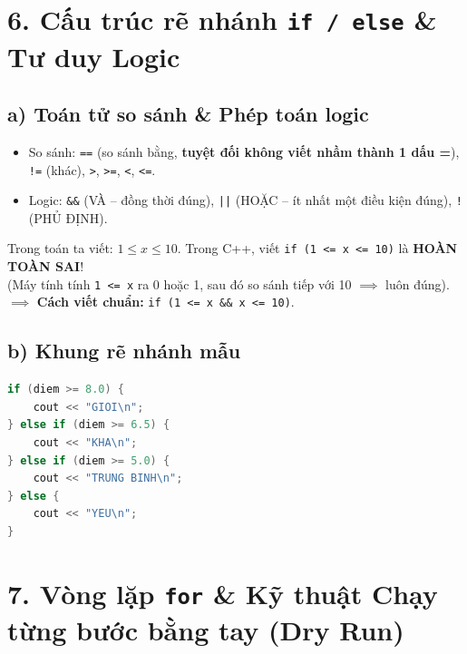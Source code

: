 \documentclass[11pt,a4paper]{article}
\begin{document}
\section*{\color{AsianDarkBlue}\normalsize 6. Cấu trúc rẽ nhánh \texttt{if / else} \& Tư duy Logic}

\subsection*{\color{AsianBlue}\small a) Toán tử so sánh \& Phép toán logic}
\begin{itemize}
    \setlength{\itemsep}{1.5pt}
    \small
    \item So sánh: \texttt{==} (so sánh bằng, \textbf{tuyệt đối không viết nhầm thành 1 dấu =}), \texttt{!=} (khác), \texttt{>}, \texttt{>=}, \texttt{<}, \texttt{<=}.
    \item Logic: \texttt{\&\&} (VÀ -- đồng thời đúng), \texttt{||} (HOẶC -- ít nhất một điều kiện đúng), \texttt{!} (PHỦ ĐỊNH).
\end{itemize}

\begin{tcolorbox}[colback=red!5!white,colframe=red!75!black,arc=1mm,title=\textbf{\footnotesize BẪY TOÁN HỌC TRONG C++: ĐIỀU KIỆN KẸP GIỮA}]
\footnotesize
Trong toán ta viết: $1 \le x \le 10$. Trong C++, viết \texttt{if (1 <= x <= 10)} là \textbf{HOÀN TOÀN SAI}!\\
(Máy tính tính \texttt{1 <= x} ra 0 hoặc 1, sau đó so sánh tiếp với 10 $\implies$ luôn đúng).\\
$\implies$ \textbf{Cách viết chuẩn:} \texttt{if (1 <= x \&\& x <= 10)}.
\end{tcolorbox}

\subsection*{\color{AsianBlue}\small b) Khung rẽ nhánh mẫu}
\begin{lstlisting}[language=C++]
if (diem >= 8.0) {
    cout << "GIOI\n";
} else if (diem >= 6.5) {
    cout << "KHA\n";
} else if (diem >= 5.0) {
    cout << "TRUNG BINH\n";
} else {
    cout << "YEU\n";
}
\end{lstlisting}

\section*{\color{AsianDarkBlue}\normalsize 7. Vòng lặp \texttt{for} \& Kỹ thuật Chạy từng bước bằng tay (Dry Run)}
\end{document}
